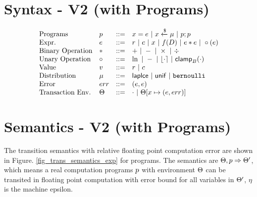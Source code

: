 \documentclass[a4paper,11pt]{article}
\begin{document}
\section{Syntax - V2 (with Programs)}
\[\begin{array}{llll}
\mbox{Programs} & \prog & ::= & 
     \varx = \expr ~|~ \varx \samplel \edistr
	~|~ \prog ; \prog \\

\mbox{Expr.} & \expr & ::= & \rval ~|~  \fval
	~|~ \varx ~|~ f(\data) ~|~ \expr \bop \expr
	~|~ \uop (\expr) \\
%
\mbox{Binary Operation} & \bop & ::= & + ~|~ - ~|~ \times ~|~ \div \\
%
\mbox{Unary Operation} & \uop & ::= & \ln ~|~ - ~|~ \round{\cdot} 
	~|~ \clamp_B(\cdot) \\
%
\mbox{Value} & \valv & ::= & \rval ~|~  \fval \\
%
\mbox{Distribution} & \edistr & ::= & \laplace ~|~ \uniform ~|~ \bernoulli \\ 
%
\mbox{Error} & \err & ::= & (\expr, \expr) \\
%
\mbox{Transaction Env.} & \trsenv & ::= & \cdot ~|~ \trsenv[x \mapsto (\expr, \err)] \\
\end{array}
\]

\newpage
\section{Semantics - V2 (with Programs)}

The transition semantics with relative floating point computation error are shown in Figure. \ref{fig_trans_semantics_exp} for programs. The semantics are $\Theta, p \Rightarrow \Theta'$, which means a real computation programs $p$ with environment $\Theta$ can be transited in floating point computation with error bound for all variables in $\Theta'$, $\eta$ is the machine epsilon.
\end{document}
